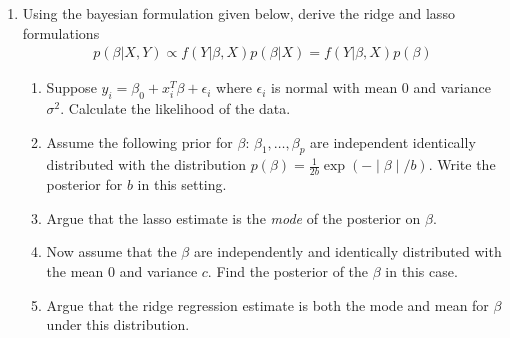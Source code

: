 \documentclass[11pt, a4paper]{article}
\begin{document}
\begin{enumerate}
        \item Using the bayesian formulation given below, derive the ridge and lasso formulations
        \begin{align*}
            p(\beta|X,Y) \propto f(Y|\beta,X)p(\beta|X) = f(Y|\beta,X)p(\beta)
        \end{align*}
        \begin{enumerate}
            \item Suppose $y_{i} = \beta_{0} + x_{i}^{T}\beta + \epsilon_{i}$ where $\epsilon_{i}$ is normal with mean $0$ and variance $\sigma^{2}$. Calculate the likelihood of the data.
            \item Assume the following prior for $\beta$: $\beta_{1},\ldots,\beta_{p}$ are independent identically distributed with the distribution $p(\beta) = \frac{1}{2b}\exp(-\mid \beta \mid/b)$. Write the posterior for $b$ in this setting.
            \item Argue that the lasso estimate is the \emph{mode} of the posterior on $\beta$.
            \item Now assume that the $\beta$ are independently and identically distributed with the mean $0$ and variance $c$. Find the posterior of the $\beta$ in this case.
            \item Argue that the ridge regression estimate is both the mode and mean for $\beta$ under this distribution.
        \end{enumerate}
    \end{enumerate}
\end{document}
